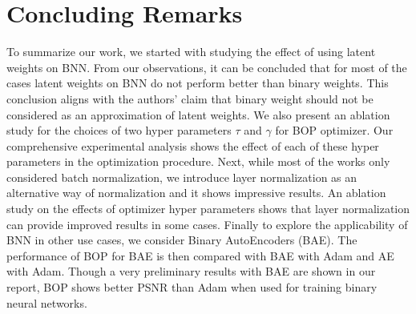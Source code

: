 \section{Concluding Remarks}
To summarize our work, we started with studying the effect of using latent weights on BNN. From our observations, it can be concluded that for most of the cases latent weights on BNN do not perform better than binary weights. This conclusion aligns with the authors' claim that binary weight should not be considered as an approximation of latent weights. We also present an ablation study for the choices of two hyper parameters $\tau$ and $\gamma$ for BOP optimizer. Our comprehensive experimental analysis shows the effect of each of these hyper parameters in the optimization procedure. Next, while most of the works only considered batch normalization, we introduce layer normalization as an alternative way of normalization and it shows impressive results. An ablation study on the effects of optimizer hyper parameters shows that layer normalization can provide improved results in some cases. Finally to explore the applicability of BNN in other use cases, we consider Binary AutoEncoders (BAE). The performance of BOP for BAE is then compared with BAE with Adam and AE with Adam. Though a very preliminary results with BAE are shown in our report, BOP shows better PSNR than Adam when used for training binary neural networks.
